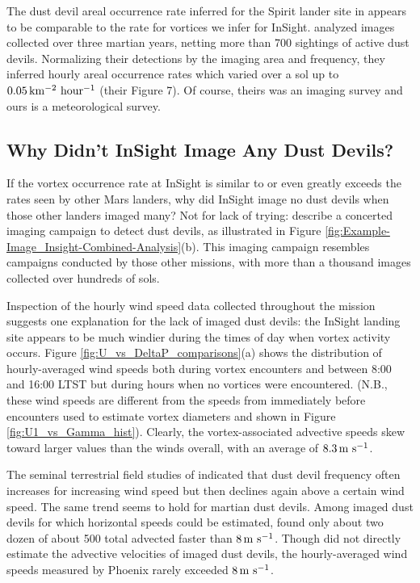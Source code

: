 \documentclass{aastex63}
\begin{document}
The dust devil areal occurrence rate inferred for the Spirit lander site in \citet{2010JGRE..115.0F02G} appears to be comparable to the rate for vortices we infer for InSight. \citet{2010JGRE..115.0F02G} analyzed images collected over three martian years, netting more than 700 sightings of active dust devils. Normalizing their detections by the imaging area and frequency, they inferred hourly areal occurrence rates which varied over a sol up to $0.05\,{\rm km^{-2}\ hour^{-1}}$ (their Figure 7). Of course, theirs was an imaging survey and ours is a meteorological survey.

\subsection{Why Didn't InSight Image Any Dust Devils?}
\label{sec:Why Didn't InSight Image Any Dust Devils?}

If the vortex occurrence rate at InSight is similar to or even greatly exceeds the rates seen by other Mars landers, why did InSight image no dust devils when those other landers imaged many? Not for lack of trying: \citet{2020NatGe..13..190B} describe a concerted imaging campaign to detect dust devils, as illustrated in Figure \ref{fig:Example-Image_Insight-Combined-Analysis}(b). This imaging campaign resembles campaigns conducted by those other missions, with more than a thousand images collected over hundreds of sols. 

Inspection of the hourly wind speed data collected throughout the mission suggests one explanation for the lack of imaged dust devils: the InSight landing site appears to be much windier during the times of day when vortex activity occurs. Figure \ref{fig:U_vs_DeltaP_comparisons}(a) shows the distribution of hourly-averaged wind speeds both during vortex encounters and between 8:00 and 16:00 LTST but during hours when no vortices were encountered. (N.B., these wind speeds are different from the speeds from immediately before encounters used to estimate vortex diameters and shown in Figure \ref{fig:U1_vs_Gamma_hist}). Clearly, the vortex-associated advective speeds skew toward larger values than the winds overall, with an average of $8.3\,{\rm m\ s^{-1}}$. 

The seminal terrestrial field studies of \citet{1969JApMe...8...32S} indicated that dust devil frequency often increases for increasing wind speed but then declines again above a certain wind speed. The same trend seems to hold for martian dust devils. Among imaged dust devils for which horizontal speeds could be estimated, \citet{2010JGRE..115.0F02G} found only about two dozen of about 500 total advected faster than $8\,{\rm m\ s^{-1}}$. Though \citet{2010JGRE..115.0E16E} did not directly estimate the advective velocities of imaged dust devils, the hourly-averaged wind speeds measured by Phoenix rarely exceeded $8\, {\rm m\ s^{-1}}$.
\end{document}
